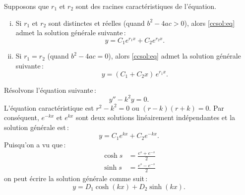 \begin{theorem}
Supposons que $r_1$ et $r_2$ sont des racines caractéristiques de l'équation.
\begin{enumerate}[(i)]
\item Si $r_1$ et $r_2$ sont distinctes et réelles (quand $b^2 - 4ac > 0$),
alors \eqref{ccsol:eq} admet la solution générale suivante\,: 
\begin{equation*}
y = C_1 e^{r_1 x} + C_2 e^{r_2 x} .
\end{equation*}
\item Si $r_1 = r_2$ (quand $b^2 - 4ac = 0$), 
alors \eqref{ccsol:eq} admet la solution générale suivante\,:
\begin{equation*}
y = (C_1 + C_2 x)\, e^{r_1 x} .
\end{equation*}
\end{enumerate}
\end{theorem}

\begin{example} \label{example:expsecondorder}
Résolvons l'équation suivante\,:
\begin{equation*}
y'' - k^2 y = 0 .
\end{equation*}
L'équation caractéristique est $r^2 - k^2 = 0$ ou 
$(r-k)(r+k) = 0$.  Par conséquent, $e^{-k x}$ et $e^{kx}$ sont deux solutions linéairement indépendantes et la solution générale est\,:  
\begin{equation*}
y = C_1 e^{kx} + C_2e^{-kx} .
\end{equation*}
Puisqu'on a vu que\,:
\begin{align*}
\cosh s & = \frac{e^s+e^{-s}}{2} \\
\sinh s & = \frac{e^s-e^{-s}}{2}
\end{align*}
on peut écrire la solution générale comme suit\,:
\begin{equation*}
y = D_1 \cosh(kx) + D_2 \sinh(kx) .
\end{equation*}
\end{example}

